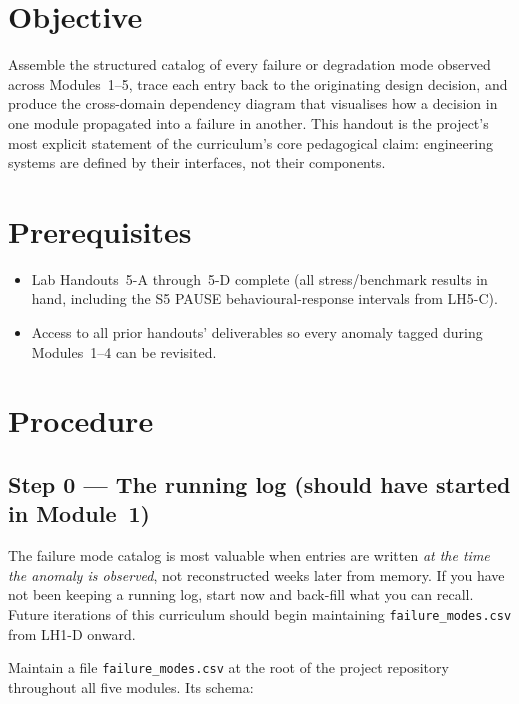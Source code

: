 \documentclass[11pt,letterpaper]{article}
\begin{document}

\section{Objective}
Assemble the structured catalog of every failure or degradation mode observed across Modules~1--5, trace each entry back to the originating design decision, and produce the cross-domain dependency diagram that visualises how a decision in one module propagated into a failure in another. This handout is the project's most explicit statement of the curriculum's core pedagogical claim: engineering systems are defined by their interfaces, not their components.

\section{Prerequisites}
\begin{itemize}[leftmargin=2em]
	\item Lab Handouts~5-A through~5-D complete (all stress/benchmark results in hand, including the S5 PAUSE behavioural-response intervals from LH5-C).
	\item Access to all prior handouts' deliverables so every anomaly tagged during Modules~1--4 can be revisited.
\end{itemize}

\section{Procedure}

\subsection{Step 0 --- The running log (should have started in Module~1)}

\begin{tcolorbox}[warning={Start this file at the beginning of the project, not here.}]
	The failure mode catalog is most valuable when entries are written \emph{at the time the anomaly is observed}, not reconstructed weeks later from memory. If you have not been keeping a running log, start now and back-fill what you can recall. Future iterations of this curriculum should begin maintaining \texttt{failure\_modes.csv} from LH1-D onward.
\end{tcolorbox}

Maintain a file \texttt{failure\_modes.csv} at the root of the project repository throughout all five modules. Its schema:
\end{document}
